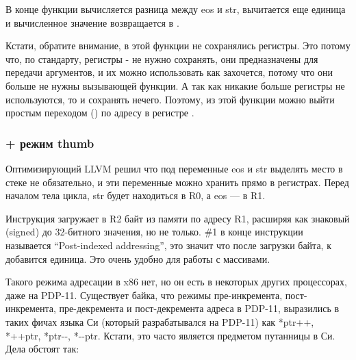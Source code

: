 В конце функции вычисляется разница между eos и str, вычитается еще единица и вычисленное значение возвращается в \Rzero.

Кстати, обратите внимание, в этой функции не сохранялись регистры. Это потому что, по стандарту, регистры \Rzero-\Rthree 
не нужно сохранять, они предназначены для передачи аргументов, и их можно использовать как захочется, потому что они больше 
не нужны вызывающей функции. 
А так как никакие больше регистры не используются, то и сохранять нечего. Поэтому, из этой функции можно выйти
простым переходом () по адресу в регистре \LR.


\subsubsection{\OptimizingXcode + режим thumb}



Оптимизирующий LLVM решил что под переменные eos и str выделять место в стеке не обязательно, и эти переменные можно хранить
прямо в регистрах. Перед началом тела цикла, str будет находиться в R0, а eos --- в R1.

Инструкция  загружает в R2 байт из памяти по адресу R1, расширяя как знаковый (signed) до 32-битного
значения, но не только. \#1 в конце инструкции называется ``Post-indexed addressing'', это значит что после загрузки байта,
к \Rone добавится единица. Это очень удобно для работы с массивами.

Такого режима адресации в x86 нет, но он есть в некоторых других процессорах, даже на PDP-11. Существует байка, что режимы
пре-инкремента, пост-инкремента, пре-декремента и пост-декремента адреса в PDP-11, выразились в таких фичах языка Си (который
разрабатывался на PDP-11) как *ptr++, *++ptr, *ptr-{}-, *-{}-ptr. Кстати, это часто является предметом путанницы в Си.
Дела обстоят так: 

